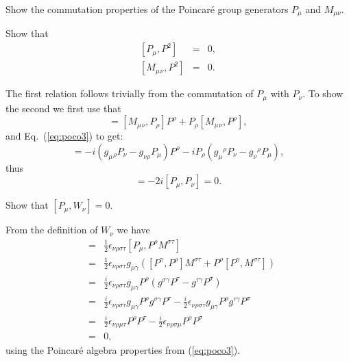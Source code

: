 \documentclass[notes.tex]{subfiles}
\begin{document}
\begin{Exercise}[]
Show the commutation properties of the Poincaré group generators $P_\mu$ and $M_{\mu\nu}$.
\end{Exercise}

\begin{Exercise}[]
Show that
\begin{eqnarray*}
\left[P_\mu, P^2\right] &=& 0,\\
\left[M_\mu{}_{\nu}, P^2\right]& =& 0.
\end{eqnarray*}
\end{Exercise}

\begin{Answer} 
The first relation follows trivially from the commutation of $P_\mu$ with $P_\nu$. To show the second
we first use that
\begin{equation*}
[M_\mu{}_\nu, P_\rho P^\rho] = [M_\mu{}_\nu, P_\rho] P^\rho  + P_\rho [M_\mu{}_\nu,  P^\rho],
\end{equation*}
and Eq.~(\ref{eq:poco3}) to get:
\begin{equation*}
[M_\mu{}_\nu, P_\rho P^\rho] = -i(g_\mu{}_\rho P_\nu - g_{\nu \rho} P_\mu) P^\rho  - iP_\rho (g_\mu{}^\rho P_\nu - g_{\nu}{}^{ \rho} P_\mu),
\end{equation*}
thus
\begin{equation*}
[M_\mu{}_\nu, P_\rho P^\rho] = -2i[P_\mu, P_\nu] = 0.
\end{equation*}
\end{Answer}

\begin{Exercise}[]
Show that $[P_\mu,W_\nu]=0$.
\end{Exercise}

\begin{Answer} 
From the definition of $W_\nu$ we have
\begin{eqnarray*}
[P_\mu,W_\nu] &=& \frac{1}{2}\epsilon_{\nu\rho\sigma\tau}[P_\mu,P^\rho M^{\sigma\tau}] \\
&=& \frac{1}{2}\epsilon_{\nu\rho\sigma\tau}g_{\mu\gamma}([P^\gamma,P^\rho]M^{\sigma\tau} + P^\rho[P^\gamma, M^{\sigma\tau}] )\\
&=& \frac{i}{2}\epsilon_{\nu\rho\sigma\tau}g_{\mu\gamma}P^\rho(g^{\sigma\gamma} P^\tau-g^{\tau\gamma}P^\sigma)\\
&=& \frac{i}{2}\epsilon_{\nu\rho\sigma\tau}g_{\mu\gamma}P^\rho g^{\sigma\gamma} P^\tau-\frac{i}{2}\epsilon_{\nu\rho\sigma\tau}g_{\mu\gamma}P^\rho g^{\tau\gamma}P^\sigma\\
&=& \frac{i}{2}\epsilon_{\nu\rho\mu\tau}P^\rho  P^\tau-\frac{i}{2}\epsilon_{\nu\rho\sigma\mu}P^\rho P^\sigma\\
&=& 0,
\end{eqnarray*}
using the Poincaré algebra properties from (\ref{eq:poco3}).
\end{Answer}
\end{document}
